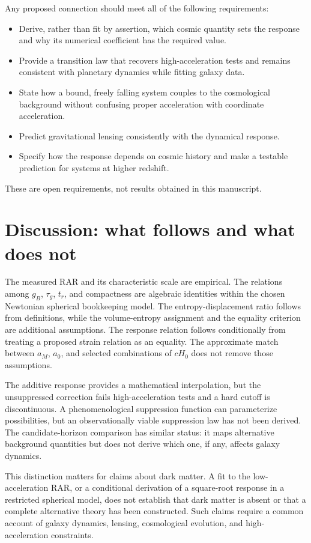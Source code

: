 \documentclass[12pt]{article}
\begin{document}
Any proposed connection should meet all of the following requirements:
\begin{itemize}[leftmargin=*]
  \item Derive, rather than fit by assertion, which cosmic quantity sets the response and why its numerical coefficient has the required value.
  \item Provide a transition law that recovers high-acceleration tests and remains consistent with planetary dynamics while fitting galaxy data.
  \item State how a bound, freely falling system couples to the cosmological background without confusing proper acceleration with coordinate acceleration.
  \item Predict gravitational lensing consistently with the dynamical response.
  \item Specify how the response depends on cosmic history and make a testable prediction for systems at higher redshift.
\end{itemize}
These are open requirements, not results obtained in this manuscript.

\section{Discussion: what follows and what does not}
\label{sec:discussion}

The measured RAR and its characteristic scale are empirical. The relations among $g_B$, $\tau_g$, $t_r$, and compactness are algebraic identities within the chosen Newtonian spherical bookkeeping model. The entropy-displacement ratio follows from definitions, while the volume-entropy assignment and the equality criterion are additional assumptions. The response relation follows conditionally from treating a proposed strain relation as an equality. The approximate match between $a_M$, $a_0$, and selected combinations of $cH_0$ does not remove those assumptions.

The additive response provides a mathematical interpolation, but the unsuppressed correction fails high-acceleration tests and a hard cutoff is discontinuous. A phenomenological suppression function can parameterize possibilities, but an observationally viable suppression law has not been derived. The candidate-horizon comparison has similar status: it maps alternative background quantities but does not derive which one, if any, affects galaxy dynamics.

This distinction matters for claims about dark matter. A fit to the low-acceleration RAR, or a conditional derivation of a square-root response in a restricted spherical model, does not establish that dark matter is absent or that a complete alternative theory has been constructed. Such claims require a common account of galaxy dynamics, lensing, cosmological evolution, and high-acceleration constraints.
\end{document}
